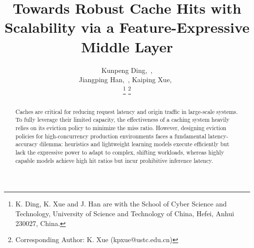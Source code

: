 \documentclass[10pt,journal]{IEEEtran}
\theoremstyle{slantedlemma}
\begin{document}
\title{Towards Robust Cache Hits with Scalability via a Feature-Expressive Middle Layer}
\author{Kunpeng Ding,~, \\Jiangping Han,~, Kaiping Xue,~

\thanks{K. Ding, K. Xue and J. Han are with the School of Cyber Science and Technology, University of Science and Technology of China, Hefei, Anhui 230027, China. }
\thanks{Corresponding Author: K. Xue (kpxue@ustc.edu.cn)}}

\maketitle

\begin{abstract}
Caches are critical for reducing request latency and origin traffic in large-scale systems. To fully leverage their limited capacity, the effectiveness of a caching system heavily relies on its eviction policy to minimize the miss ratio. However, designing eviction policies for high-concurrency production environments faces a fundamental latency-accuracy dilemma: heuristics and lightweight learning models execute efficiently but lack the expressive power to adapt to complex, shifting workloads, whereas highly capable models achieve high hit ratios but incur prohibitive inference latency.


\end{abstract}
\end{document}
